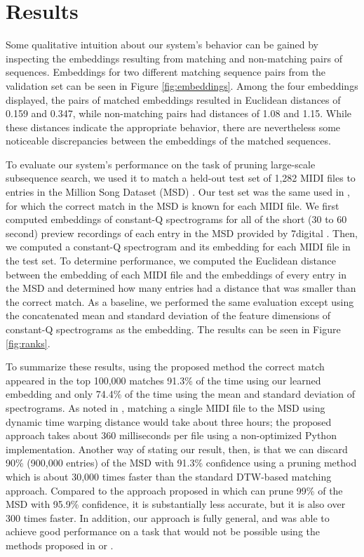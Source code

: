 \documentclass{article}
\begin{document}
\section{Results}
\label{sec:results}

Some qualitative intuition about our system's behavior can be gained by inspecting the embeddings resulting from matching and non-matching pairs of sequences.
Embeddings for two different matching sequence pairs from the validation set can be seen in Figure \ref{fig:embeddings}.
Among the four embeddings displayed, the pairs of matched embeddings resulted in Euclidean distances of 0.159 and 0.347, while non-matching pairs had distances of 1.08 and 1.15.
While these distances indicate the appropriate behavior, there are nevertheless some noticeable discrepancies between the embeddings of the matched sequences.

To evaluate our system's performance on the task of pruning large-scale subsequence search, we used it to match a held-out test set of 1,282 MIDI files to entries in the Million Song Dataset (MSD) \cite{bertin2011million}.
Our test set was the same used in \cite{raffel2015large}, for which the correct match in the MSD is known for each MIDI file.
We first computed embeddings of constant-Q spectrograms for all of the short (30 to 60 second) preview recordings of each entry in the MSD provided by 7digital \cite{schindler2012facilitating}.
Then, we computed a constant-Q spectrogram and its embedding for each MIDI file in the test set.
To determine performance, we computed the Euclidean distance between the embedding of each MIDI file and the embeddings of every entry in the MSD and determined how many entries had a distance that was smaller than the correct match.
As a baseline, we performed the same evaluation except using the concatenated mean and standard deviation of the feature dimensions of constant-Q spectrograms as the embedding.
The results can be seen in Figure \ref{fig:ranks}.

To summarize these results, using the proposed method the correct match appeared in the top 100,000 matches 91.3\% of the time using our learned embedding and only 74.4\% of the time using the mean and standard deviation of spectrograms.
As noted in \cite{raffel2015large}, matching a single MIDI file to the MSD using dynamic time warping distance would take about three hours; the proposed approach takes about 360 milliseconds per file using a non-optimized Python implementation.
Another way of stating our result, then, is that we can discard 90\% (900,000 entries) of the MSD with 91.3\% confidence using a pruning method which is about 30,000 times faster than the standard DTW-based matching approach.
Compared to the approach proposed in \cite{raffel2015large} which can prune 99\% of the MSD with 95.9\% confidence, it is substantially less accurate, but it is also over 300 times faster.
In addition, our approach is fully general, and was able to achieve good performance on a task that would not be possible using the methods proposed in \cite{rakthanmanon2012searching} or \cite{papapetrou2011embedding}.
\end{document}
